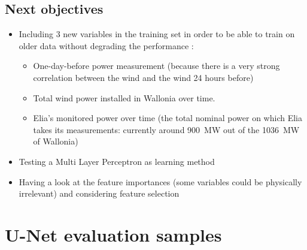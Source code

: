 \documentclass[a4paper, 12pt]{article}
\begin{document}
    \subsection{Next objectives}
    
    \begin{itemize}
        \item Including 3 new variables in the training set in order to be able to train on older data without degrading the performance :
        \begin{itemize}
            \item One-day-before power measurement (because there is a very strong correlation between the wind and the wind 24 hours before)
            \item Total wind power installed in Wallonia over time.
            \item Elia's monitored power over time (the total nominal power on which Elia takes its measurements: currently around \SI{900}{\mega\watt} out of the \SI{1036}{\mega\watt} of Wallonia)
        \end{itemize}
        \item Testing a Multi Layer Perceptron as learning method
        \item Having a look at the feature importances (some variables could be physically irrelevant) and considering feature selection
    \end{itemize}
    
    \newpage
	\printbibliography
	\appendix
	
	\section{U-Net evaluation samples}
	
\end{document}
